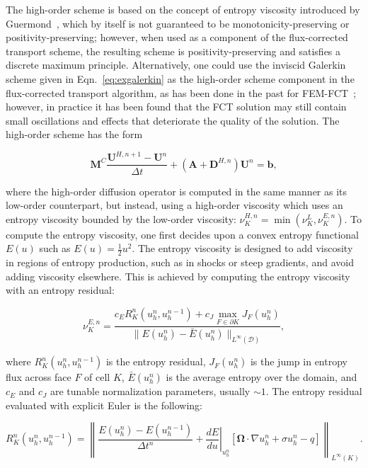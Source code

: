 The high-order scheme is based on the concept of entropy
viscosity introduced by Guermond~\cite{guermond_ev}, which by itself
is not guaranteed to be monotonicity-preserving or positivity-preserving;
however, when used as a component of the flux-corrected transport scheme,
the resulting scheme is positivity-preserving
and satisfies a discrete maximum principle. Alternatively, one could use
the inviscid Galerkin scheme given in Eqn.~\ref{eq:exgalerkin} as
the high-order scheme component in the flux-corrected transport algorithm,
as has been done in the past for FEM-FCT~\cite{kuzmin_book}; however,
in practice it has been found that the FCT solution may still
contain small oscillations and effects that deteriorate the quality of the solution.
The high-order scheme has the form

\begin{equation}\label{eq:highorderscheme}
   \mathbf{M}^C\frac{\mathbf{U}^{H,n+1}-\mathbf{U}^n}{\Delta t}
      +\left(\mathbf{A}+\mathbf{D}^{H,n}\right)\mathbf{U}^n = \mathbf{b},
\end{equation}

where the high-order diffusion operator is computed in the same manner
as its low-order counterpart, but instead, using a high-order viscosity
which uses an entropy viscosity bounded by the low-order viscosity:
$\nu^{H,n}_K = \min(\nu^{L}_K,\nu^{E,n}_K)$. To compute the entropy
viscosity, 
one first decides upon a convex entropy functional $E(u)$ such as $E(u)=\frac{1}{2}u^2$.
The entropy viscosity is designed to add viscosity in regions of entropy
production, such as in shocks or steep gradients, and avoid adding
viscosity elsewhere. This is achieved by computing the entropy viscosity
with an entropy residual:

\begin{equation}
   \nu^{E,n}_K = \frac{c_E R_K^n(u_h^n,u_h^{n-1})
      + c_J\max\limits_{F\in\partial K}J_F(u_h^n)}
      {\|E(u_h^n)-\bar{E}(u_h^n)\|_{L^\infty(\mathcal{D})}},
\end{equation}

where $R_K^n(u_h^n,u_h^{n-1})$ is the entropy residual, $J_F(u_h^n)$
is the jump in entropy flux across face $F$ of cell $K$, $\bar{E}(u_h^n)$ is the average
entropy over the domain, and $c_E$ and $c_J$ are tunable normalization
parameters, usually $\sim 1$.
The entropy residual evaluated with explicit Euler is the following:

\begin{equation}
    R_K^n(u_h^n,u_h^{n-1}) = \left\|\frac{E(u_h^n)-E(u_h^{n-1})}{\Delta t^n}
      + \left.\frac{dE}{du}\right|_{u_h^n}\left[\mathbf{\Omega}\cdot\nabla u_h^n
      + \sigma u_h^n
      - q \right]\right\|_{L^\infty(K)}.
\end{equation}

